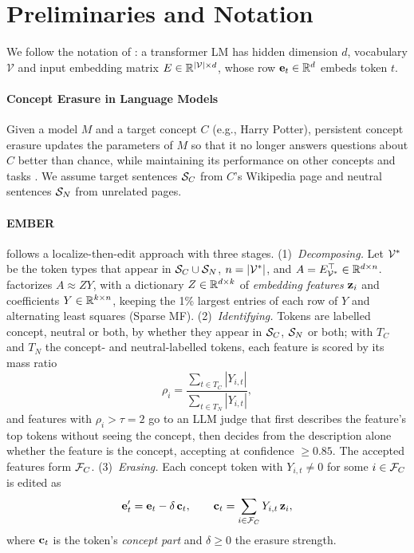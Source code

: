 \section{Preliminaries and Notation}
\label{sec:prelim}

We follow the notation of \citet{suslik2026ember}: a transformer LM \citep{vaswani2017attention} has hidden dimension $d$, vocabulary $\mathcal V$ and input embedding matrix $E \in \mathbb{R}^{|\mathcal V| \times d}$, whose row $\mathbf{e}_t \in \mathbb{R}^d$ embeds token $t$.

\paragraph{Concept Erasure in Language Models}
Given a model $M$ and a target concept $C$ (e.g., Harry Potter), persistent concept erasure updates the parameters of $M$ so that it no longer answers questions about $C$ better than chance, while maintaining its performance on other concepts and tasks \citep{eldan2023harry,li2024wmdp,gurarieh2025precise,suslik2026ember}.
We assume target sentences $\mathcal{S}_C$ from $C$'s Wikipedia page and neutral sentences $\mathcal{S}_N$ from unrelated pages.

\paragraph{EMBER}
\ember{} follows a localize-then-edit approach with three stages.
(1)~\emph{Decomposing.}
Let $\mathcal{V}^*$ be the token types that appear in $\mathcal{S}_C \cup \mathcal{S}_N$, $n = |\mathcal{V}^*|$, and $A = E_{\mathcal{V}^*}^{\top} \in \mathbb{R}^{d \times n}$.
\ember{} factorizes $A \approx ZY$, with a dictionary $Z \in \mathbb{R}^{d \times k}$ of \emph{embedding features} $\mathbf{z}_i$ and coefficients $Y \in \mathbb{R}^{k \times n}$, keeping the 1\% largest entries of each row of $Y$ and alternating least squares (Sparse MF).
(2)~\emph{Identifying.}
Tokens are labelled concept, neutral or both, by whether they appear in $\mathcal{S}_C$, $\mathcal{S}_N$ or both; with $T_C$ and $T_N$ the concept- and neutral-labelled tokens, each feature is scored by its mass ratio
\begin{equation}
  \rho_i = \frac{\sum_{t\in T_C} |Y_{i,t}|}{\sum_{t \in T_N} |Y_{i,t}|},
  \label{eq:rho}
\end{equation}
and features with $\rho_i > \tau = 2$ go to an LLM judge that first describes the feature's top tokens without seeing the concept, then decides from the description alone whether the feature is the concept, accepting at confidence $\geq 0.85$.
The accepted features form $\mathcal{F}_C$.
(3)~\emph{Erasing.}
Each concept token with $Y_{i,t} \neq 0$ for some $i \in \mathcal{F}_C$ is edited as
\begin{equation}
  \mathbf{e}_t' = \mathbf{e}_t - \delta\, \mathbf{c}_t, \qquad \mathbf{c}_t = \sum_{i \in \mathcal{F}_C} Y_{i,t}\, \mathbf{z}_i ,
  \label{eq:edit}
\end{equation}
where $\mathbf{c}_t$ is the token's \emph{concept part} and $\delta \geq 0$ the erasure strength.

